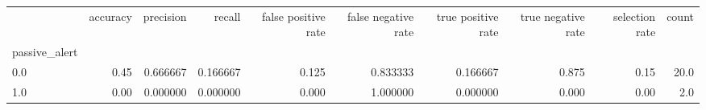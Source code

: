 \begin{tabular}{lrrrrrrrrr}
\toprule
{} &  accuracy &  precision &    recall &  false positive rate &  false negative rate &  true positive rate &  true negative rate &  selection rate &  count \\
passive\_alert &           &            &           &                      &                      &                     &                     &                 &        \\
\midrule
0.0           &      0.45 &   0.666667 &  0.166667 &                0.125 &             0.833333 &            0.166667 &               0.875 &            0.15 &   20.0 \\
1.0           &      0.00 &   0.000000 &  0.000000 &                0.000 &             1.000000 &            0.000000 &               0.000 &            0.00 &    2.0 \\
\bottomrule
\end{tabular}

